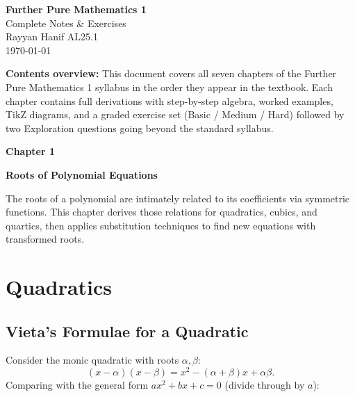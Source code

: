 \documentclass[12pt,a4paper]{article}
\theoremstyle{defstyle}
\newcommand{\chapterbanner}[2]{%
  \clearpage
  \begin{tcolorbox}[colback=chaptercol!10, colframe=chaptercol,
      left=10pt, right=10pt, top=8pt, bottom=8pt]
    {\large\bfseries\color{chaptercol} Chapter #1}\par\vspace{2pt}
    {\LARGE\bfseries #2}
  \end{tcolorbox}
  \vspace{6pt}
}
\begin{document}
\thispagestyle{empty}

\begin{center}
  \vspace*{2cm}
  {\fontsize{32}{38}\selectfont\bfseries\color{chaptercol}
   Further Pure Mathematics 1}\\[12pt]
  {\Large Complete Notes \& Exercises}\\[8pt]
  {\large Rayyan Hanif AL25.1}\\[6pt]
  {\normalsize\today}\\[30pt]

  \begin{tcolorbox}[colback=chaptercol!8, colframe=chaptercol!60,
      width=0.85\textwidth, left=10pt, right=10pt]
  \small
  \textbf{Contents overview:}
  This document covers all seven chapters of the Further Pure Mathematics 1 syllabus
  in the order they appear in the textbook.
  Each chapter contains full derivations with step-by-step algebra, worked examples,
  TikZ diagrams, and a graded exercise set (Basic / Medium / Hard) followed by
  two Exploration questions going beyond the standard syllabus.
  \end{tcolorbox}
\end{center}

\newpage
\tableofcontents
\newpage

\chapterbanner{1}{Roots of Polynomial Equations}

The roots of a polynomial are intimately related to its coefficients via symmetric functions.
This chapter derives those relations for quadratics, cubics, and quartics, then applies substitution techniques to find new equations with transformed roots.

\section{Quadratics}

\subsection{Vieta's Formulae for a Quadratic}

Consider the monic quadratic with roots \(\alpha,\beta\):
\[
  (x-\alpha)(x-\beta) = x^2 - (\alpha+\beta)x + \alpha\beta.
\]
Comparing with the general form \(ax^2+bx+c=0\) (divide through by \(a\)):
\end{document}
